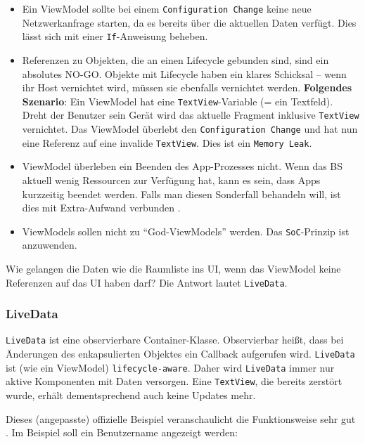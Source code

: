 \begin{itemize}
\tightlist
\item
  Ein ViewModel sollte bei einem \texttt{Configuration\ Change} keine
  neue Netzwerkanfrage starten, da es bereits über die aktuellen Daten
  verfügt. Dies lässt sich mit einer \texttt{If}-Anweisung beheben.
\item
  Referenzen zu Objekten, die an einen Lifecycle gebunden sind, sind ein
  absolutes NO-GO. Objekte mit Lifecycle haben ein klares Schicksal --
  wenn ihr Host vernichtet wird, müssen sie ebenfalls vernichtet werden.
  \textbf{Folgendes Szenario}: Ein ViewModel hat eine
  \texttt{TextView}-Variable (= ein Textfeld). Dreht der Benutzer sein
  Gerät wird das aktuelle Fragment inklusive \texttt{TextView}
  vernichtet. Das ViewModel überlebt den \texttt{Configuration\ Change}
  und hat nun eine Referenz auf eine invalide \texttt{TextView}. Dies
  ist ein \texttt{Memory\ Leak}.
\item
  ViewModel überleben ein Beenden des App-Prozesses nicht. Wenn das BS
  aktuell wenig Ressourcen zur Verfügung hat, kann es sein, dass Apps
  kurzzeitig beendet werden. Falls man diesen Sonderfall behandeln will,
  ist dies mit Extra-Aufwand verbunden \cite{viewmodel-process-death}.
\item
  ViewModels sollen nicht zu ``God-ViewModels'' werden. Das
  \texttt{SoC}-Prinzip ist anzuwenden.
\end{itemize}

Wie gelangen die Daten wie \zB die Raumliste ins UI, wenn das ViewModel
keine Referenzen auf das UI haben darf? Die Antwort lautet
\texttt{LiveData}.

\hypertarget{livedata}{%
\subsubsection{LiveData}\label{livedata}}

\texttt{LiveData} ist eine observierbare Container-Klasse. Observierbar
heißt, dass bei Änderungen des enkapsulierten Objektes ein Callback
aufgerufen wird. \texttt{LiveData} ist (wie ein ViewModel)
\texttt{lifecycle-aware}. Daher wird \texttt{LiveData} immer nur aktive
Komponenten mit Daten versorgen. Eine \texttt{TextView}, die bereits
zerstört wurde, erhält dementsprechend auch keine Updates mehr.

Dieses (angepasste) offizielle Beispiel veranschaulicht die
Funktionsweise sehr gut \cite{livedata}. Im Beispiel soll ein
Benutzername angezeigt werden:

